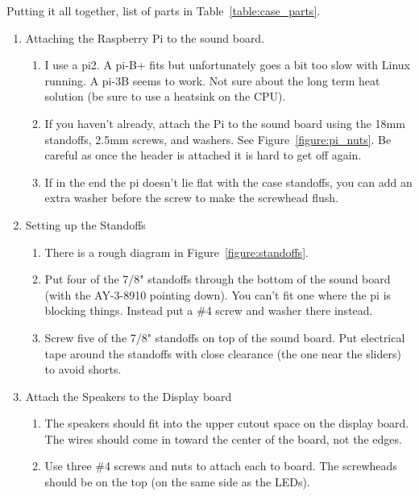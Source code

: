 \documentclass[11pt]{article}
\begin{document}
Putting it all together, list of parts in Table~\ref{table:case_parts}.
\begin{enumerate}

	\item Attaching the Raspberry Pi to the sound board.
		\begin{enumerate}

		\item I use a pi2.
			A pi-B+ fits but unfortunately goes a bit too slow with
			Linux running.
			A pi-3B seems to work.  Not sure about the long
			term heat solution (be sure to use a heatsink on the CPU).

		\item If you haven't already, attach the Pi to the sound board
			using the 18mm standoffs, 2.5mm screws, and washers.
			See Figure~\ref{figure:pi_nuts}.
			Be careful as once the header is attached it
			is hard to get off again.

		\item If in the end the pi doesn't lie flat with the
			case standoffs, you can add an extra washer
			before the screw to make the screwhead flush.

		\end{enumerate}

	\item Setting up the Standoffs

		\begin{enumerate}

		\item There is a rough diagram in Figure~\ref{figure:standoffs}.
		\item Put four of the 7/8" standoffs through the bottom
			of the sound board
			(with the AY-3-8910 pointing down).
			You can't fit one where the pi is blocking things.
			Instead put a \#4 screw and washer there instead.

		\item Screw five of the 7/8" standoffs on top of the sound
			board.
			Put electrical tape around the standoffs with close
			clearance (the one near the sliders)
			to avoid shorts.

		\end{enumerate}

	\item Attach the Speakers to the Display board

		\begin{enumerate}
		
		\item The speakers should fit into the upper cutout space
			on the display board.
			The wires should come in toward the center of the board,
			not the edges.
		\item	Use three \#4 screws and nuts to attach each to board.
			The screwheads should be on the top (on the same
			side as the LEDs).


\end{enumerate}
\end{enumerate}
\end{document}

